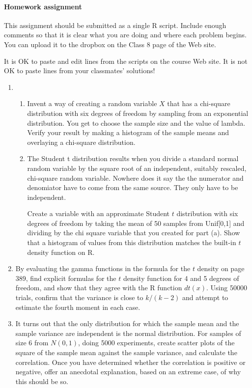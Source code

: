 \documentclass[12pt]{article}
\begin{document}
\pagebreak


\paragraph*{Homework assignment}

This assignment should be submitted as a single R script. Include enough comments so that it is clear what you are doing and where each problem begins. You can upload it to the dropbox on the Class 8 page of the Web site. 

It is OK to paste and edit lines from the scripts on the course Web site. It is not OK to paste lines from your classmates' solutions!

\begin{enumerate}
\item \begin{enumerate}
\item Invent a way of creating a random variable $X$ that has a chi-square distribution with six degrees of freedom by sampling from an exponential distribution. You get to choose the sample size and the value of lambda. Verify your result by making a histogram of the sample means and overlaying a chi-square distribution.

\item The Student t distribution results when you divide a standard normal random variable by the square root of an independent,  suitably rescaled, chi-square random variable. Nowhere does it say the the numerator and denomiator have to come from the same source. They only have to be independent. 

Create a variable with an approximate Student $t$ distribution with six degrees of freedom by taking the mean of 50 samples from Unif[0,1] and dividing by the chi square variable that you created for part (a). Show that a histogram of values from this distribution matches the built-in $t$ density function on R.

\end{enumerate}

\item By evaluating the gamma functions in the formula for the $t$ density on page 389, find explicit formulas for the $t$ density function for 4 and 5 degrees of freedom, and show that they agree with the R function $dt(x).$  Using 50000 trials, confirm that the variance is close to $k/(k-2)$ and attempt to estimate the fourth moment in each case.

\item It turns out that the only distribution for which the sample mean and the sample variance are independent is the normal distribution. For samples of size 6 from $N(0,1)$, doing 5000 experiments, create scatter plots of the square of the sample mean against the sample variance, and calculate the correlation. Once you have determined whether the correlation is positive or negative, offer an anecdotal explanation, based on an extreme case, of why this should be so.


\end{enumerate}
\end{document}

